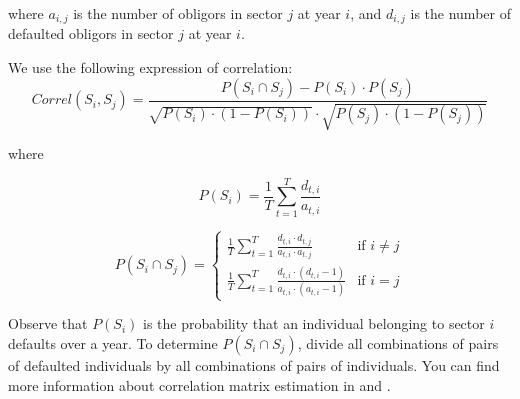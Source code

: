 \documentclass[a4paper,12pt,final]{article}
\begin{document}
where $a_{i,j}$ is the number of obligors in sector $j$ at year $i$, and
$d_{i,j}$ is the number of defaulted obligors in sector $j$ at year $i$.
\newline

We use the following expression of correlation:
\begin{displaymath}
Correl(S_i,S_j) = \frac{P(S_i \cap S_j) - P(S_i) \cdot P(S_j)}{\sqrt{P(S_i) \cdot (1-P(S_i))} \cdot \sqrt{P(S_j) \cdot (1-P(S_j))}}
\end{displaymath}

where

\begin{displaymath}
P(S_i) = \frac{1}{T} \sum_{t=1}^{T} \frac{d_{t,i}}{a_{t,i}}
\end{displaymath}

\begin{displaymath}
P(S_i \cap S_j) = \left\{
\begin{array}{ll}
\frac{1}{T} \sum_{t=1}^{T} \frac{d_{t,i} \cdot d_{t,j}}{a_{t,i} \cdot a_{t,j}} & \textrm{if  } i \neq j \\
\frac{1}{T} \sum_{t=1}^{T} \frac{d_{t,i} \cdot (d_{t,i}-1)}{a_{t,i} \cdot (a_{t,i}-1)} & \textrm{if  } i = j
\end{array}
\right.
\end{displaymath}

Observe that $P(S_i)$ is the probability that an individual belonging to sector $i$
defaults over a year. To determine $P(S_i \cap S_j)$, divide all combinations of pairs 
of defaulted individuals by all combinations of pairs of individuals. You can find 
more information about correlation matrix estimation in \cite{correlations:ubs} and 
\cite{correlations:cmetrics}.
\end{document}
